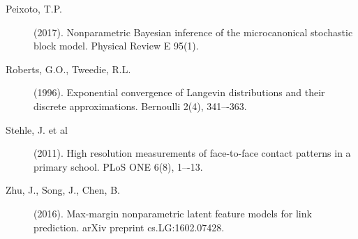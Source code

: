 \begin{description}
	\item[Peixoto, T.P.] (2017).
	Nonparametric Bayesian inference of the microcanonical
	stochastic block model. Physical Review E 95(1).

	\item[Roberts, G.O., Tweedie, R.L.] (1996).
	Exponential convergence of Langevin distributions and their discrete approximations.
	Bernoulli 2(4), 341–-363.

	\item[Stehle, J. et al] (2011).
	High resolution measurements of face-to-face contact patterns in a primary school.
	PLoS ONE 6(8), 1–-13.

	\item[Zhu, J., Song, J., Chen, B.] (2016).
	Max-margin nonparametric latent feature models for link prediction.
	arXiv preprint cs.LG:1602.07428.
\end{description}